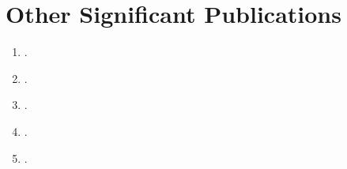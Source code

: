 \section*{Other Significant Publications}

\begin{enumerate}
	\item {}.
	\item {}.
	\item {}.
	\item {}.
    \item {}.
\end{enumerate}







